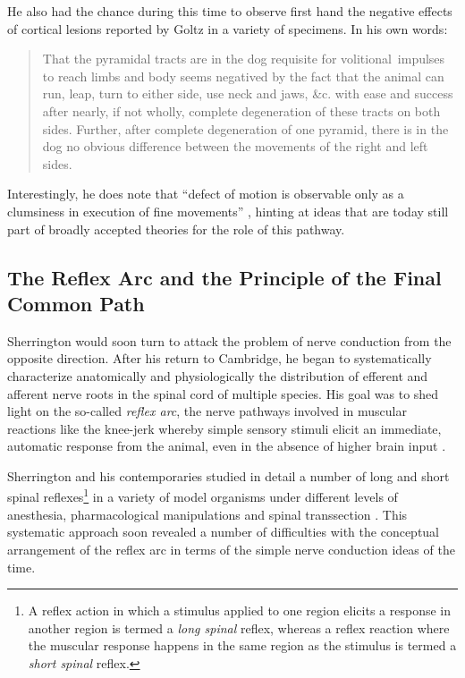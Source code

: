 He also had the chance during this time to observe first hand the negative effects of cortical lesions reported by Goltz in a variety of specimens. In his own words:

\blockquote[{\protect\cite[p.189]{Sherrington1885}}]{That the pyramidal tracts are in the dog requisite for volitional~impulses to reach limbs and body seems negatived by the fact that the animal can run, leap, turn to either side, use neck and jaws, \&c. with ease and success after nearly, if not wholly, complete degeneration of these tracts on both sides. Further, after complete degeneration of one pyramid, there is in the dog no obvious difference between the movements of the right and left sides.}

Interestingly, he does note that \enquote{defect of motion is observable only as a clumsiness in execution of fine movements} \cite{Sherrington1885}, hinting at ideas that are today still part of broadly accepted theories for the role of this pathway.

\subsection{The Reflex Arc and the Principle of the Final Common Path}

Sherrington would soon turn to attack the problem of nerve conduction from the opposite direction. After his return to Cambridge, he began to systematically characterize anatomically and physiologically the distribution of efferent \cite{Sherrington1892} and afferent \cite{Sherrington1893a} nerve roots in the spinal cord of multiple species. His goal was to shed light on the so-called \emph{reflex arc}, the nerve pathways involved in muscular reactions like the knee-jerk whereby simple sensory stimuli elicit an immediate, automatic response from the animal, even in the absence of higher brain input \cite{Sherrington1893b}.

Sherrington and his contemporaries studied in detail a number of long and short spinal reflexes\footnote{A reflex action in which a stimulus applied to one region elicits a response in another region is termed a \emph{long spinal} reflex, whereas a reflex reaction where the muscular response happens in the same region as the stimulus is termed a \emph{short spinal} reflex.} in a variety of model organisms under different levels of anesthesia, pharmacological manipulations and spinal transsection \cite{Sherrington1903}. This systematic approach soon revealed a number of difficulties with the conceptual arrangement of the reflex arc in terms of the simple nerve conduction ideas of the time.

